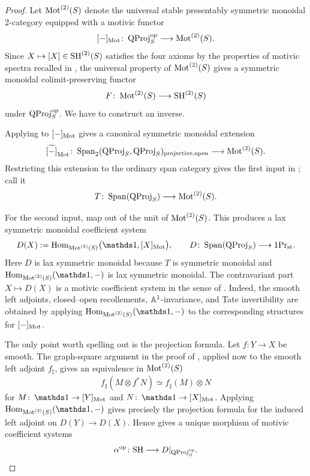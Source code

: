 \documentclass[11pt]{book}
\begin{document}
	\begin{proof}
		Let $\Mot^{(2)}(S)$ denote the universal stable presentably symmetric monoidal $2$-category equipped with a motivic functor
		\[
			[-]_{\Mot}\colon\operatorname{QProj}_S\catop\longrightarrow\Mot^{(2)}(S).
		\]
		Since $X\mapsto[X]\in\SH^{(2)}(S)$ satisfies the four axioms by the properties of motivic spectra recalled in , the universal property of $\Mot^{(2)}(S)$ gives a symmetric monoidal colimit-preserving functor
		\[
			F\colon\Mot^{(2)}(S)\longrightarrow\SH^{(2)}(S)
		\]
		under $\operatorname{QProj}_S\catop$. We have to construct an inverse.

		Applying  to $[-]_{\Mot}$ gives a canonical symmetric monoidal extension
		\[
			\widetilde{[-]}_{\Mot}\colon
			\SpanTwoP{\operatorname{QProj}_S}{\operatorname{QProj}_S}{\mathrm{open}}{\mathrm{projective}}
			\longrightarrow\Mot^{(2)}(S).
		\]
		Restricting this extension to the ordinary span category gives the first input in ; call it
		\[
			T\colon\Span(\operatorname{QProj}_S)\longrightarrow\Mot^{(2)}(S).
		\]

		For the second input, map out of the unit of $\Mot^{(2)}(S)$. This produces a lax symmetric monoidal coefficient system
		\[
			D(X):=\Hom_{\Mot^{(2)}(S)}\bigl(\unit,[X]_{\Mot}\bigr),
			\qquad
			D\colon\Span(\operatorname{QProj}_S)\longrightarrow1\Pr_{\st}.
		\]
		Here $D$ is lax symmetric monoidal because $T$ is symmetric monoidal and $\Hom_{\Mot^{(2)}(S)}(\unit,-)$ is lax symmetric monoidal. The contravariant part $X\mapsto D(X)$ is a motivic coefficient system in the sense of . Indeed, the smooth left adjoints, closed--open recollements, $\bbA^1$-invariance, and Tate invertibility are obtained by applying $\Hom_{\Mot^{(2)}(S)}(\unit,-)$ to the corresponding structures for $[-]_{\Mot}$.

		The only point worth spelling out is the projection formula. Let $f\colon Y\to X$ be smooth. The graph-square argument in the proof of , applied now to the smooth left adjoint $f_\sharp$, gives an equivalence in $\Mot^{(2)}(S)$
		\[
			f_\sharp(M\otimes f^*N)
			\simeq
			f_\sharp(M)\otimes N
		\]
		for $M\colon\unit\to[Y]_{\Mot}$ and $N\colon\unit\to[X]_{\Mot}$. Applying $\Hom_{\Mot^{(2)}(S)}(\unit,-)$ gives precisely the projection formula for the induced left adjoint on $D(Y)\to D(X)$. Hence  gives a unique morphism of motivic coefficient systems
		\[
			\alpha^{\op}\colon\SH\longrightarrow D|_{\operatorname{QProj}_S\catop}.
		\]


\end{proof}
\end{document}
